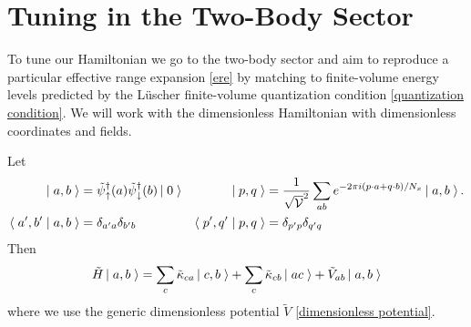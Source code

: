 \section{Tuning in the Two-Body Sector}\label{sec:tuning}

To tune our Hamiltonian we go to the two-body sector and aim to reproduce a particular effective range expansion \eqref{ere} by matching to finite-volume energy levels predicted by the L\"{u}scher finite-volume quantization condition \eqref{quantization condition}.
We will work with the dimensionless Hamiltonian with dimensionless coordinates and fields.

Let
\begin{align}
	\left|\;a,b\;\right\rangle &= \tilde{\psi}{}^{\dagger}_{\uparrow}(a) \tilde{\psi}{}^{\dagger}_{\downarrow}(b) \left|\;0\;\right\rangle
	&
	\left|\;p,q\;\right\rangle &= \frac{1}{\sqrt{\mathcal{V}}^2}\sum_{ab} e^{-2\pi i (p\cdot a + q \cdot b)/N_x} \left|\;a,b\;\right\rangle.
	\\
	\left\langle\;a',b'\;\middle|\;a,b\;\right\rangle &= \delta_{a'a} \delta_{b'b}
	&
	\left\langle\;p',q'\;\middle|\;p,q\;\right\rangle &= \delta_{p'p} \delta_{q'q}
\end{align}
Then
\begin{equation}
	\tilde{H} \left|\;a,b\;\right\rangle = \sum_{c} \tilde{\kappa}_{ca}\left|\;c,b\;\right\rangle + \sum_{c} \tilde{\kappa}_{cb}\left|\;ac\;\right\rangle + \tilde{V}_{ab} \left|\;a,b\;\right\rangle
\end{equation}
where we use the generic dimensionless potential $\tilde{V}$ \eqref{dimensionless potential}.

